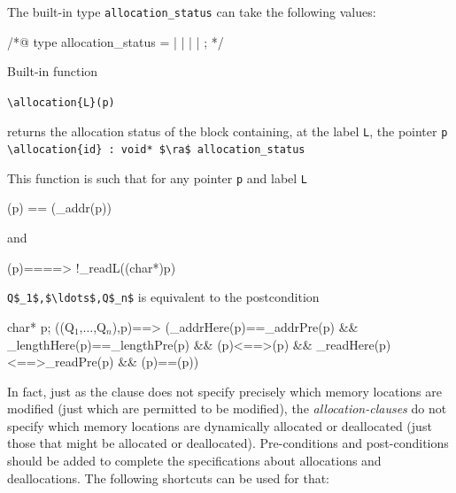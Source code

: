 The built-in type \lstinline|allocation_status|
can take the following values:
\begin{notimplementedenv}
\begin{listing-nonumber}
/*@
type allocation_status =
    \static | \register | \automatic | \dynamic | \unallocated;
*/
\end{listing-nonumber}
\end{notimplementedenv}

Built-in function
\begin{notimplementedenv}\lstinline|\allocation{L}(p)|\end{notimplementedenv}%
returns the allocation status of the block containing, at the label
\lstinline|L|, the pointer \lstinline|p|
\\ \makebox[5mm]{} \lstinline|\allocation{id} : void* $\ra$ allocation_status|

This function is such that for any pointer \lstinline|p| and label \lstinline|L|
\begin{listing-nonumber}
(p) == (\base_addr(p))
\end{listing-nonumber}
and
\begin{listing-nonumber}
(p)==\unallocated ==> !\valid_read{L}((char*)p)
\end{listing-nonumber}

\allocates \lstinline|Q$_1$,$\ldots$,Q$_n$| is equivalent to the postcondition
\begin{listing-nonumber}
\forall char* p;
\separated(\union(Q$_1$,$\ldots$,Q$_n$),p)==>
     (\base_addr{Here}(p)==\base_addr{Pre}(p)
      && \block_length{Here}(p)==\block_length{Pre}(p)
      && (p)<==>(p)
      && \valid_read{Here}(p)<==>\valid_read{Pre}(p)
      && (p)==(p))
\end{listing-nonumber}

In fact, just as the \assigns clause does not specify precisely which memory locations are
modified (just which are permitted to be modified),
the \textsl{allocation-clauses} do not specify which memory locations
are dynamically allocated or deallocated (just those that might be allocated or deallocated).
Pre-conditions and post-conditions should be added to complete the specifications
about allocations and deallocations.
The following shortcuts can be used for that:

